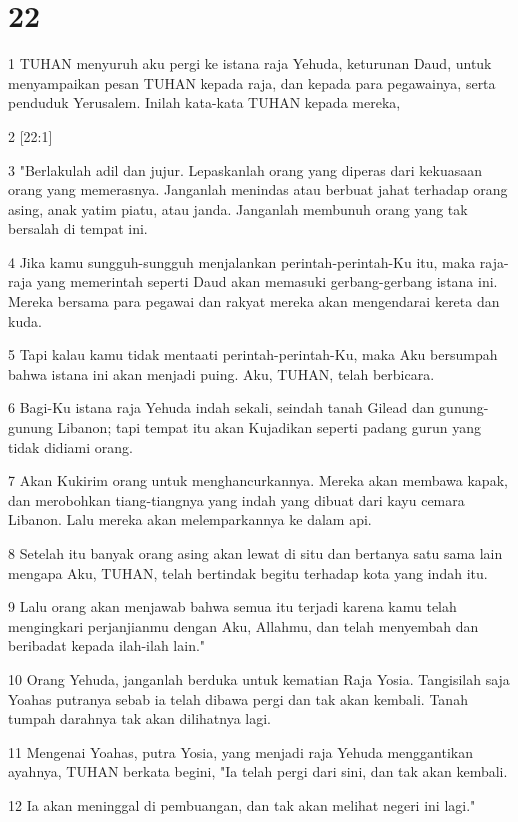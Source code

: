 \chapter{22}

\par 1 TUHAN menyuruh aku pergi ke istana raja Yehuda, keturunan Daud, untuk menyampaikan pesan TUHAN kepada raja, dan kepada para pegawainya, serta penduduk Yerusalem. Inilah kata-kata TUHAN kepada mereka,
\par 2 [22:1]
\par 3 "Berlakulah adil dan jujur. Lepaskanlah orang yang diperas dari kekuasaan orang yang memerasnya. Janganlah menindas atau berbuat jahat terhadap orang asing, anak yatim piatu, atau janda. Janganlah membunuh orang yang tak bersalah di tempat ini.
\par 4 Jika kamu sungguh-sungguh menjalankan perintah-perintah-Ku itu, maka raja-raja yang memerintah seperti Daud akan memasuki gerbang-gerbang istana ini. Mereka bersama para pegawai dan rakyat mereka akan mengendarai kereta dan kuda.
\par 5 Tapi kalau kamu tidak mentaati perintah-perintah-Ku, maka Aku bersumpah bahwa istana ini akan menjadi puing. Aku, TUHAN, telah berbicara.
\par 6 Bagi-Ku istana raja Yehuda indah sekali, seindah tanah Gilead dan gunung-gunung Libanon; tapi tempat itu akan Kujadikan seperti padang gurun yang tidak didiami orang.
\par 7 Akan Kukirim orang untuk menghancurkannya. Mereka akan membawa kapak, dan merobohkan tiang-tiangnya yang indah yang dibuat dari kayu cemara Libanon. Lalu mereka akan melemparkannya ke dalam api.
\par 8 Setelah itu banyak orang asing akan lewat di situ dan bertanya satu sama lain mengapa Aku, TUHAN, telah bertindak begitu terhadap kota yang indah itu.
\par 9 Lalu orang akan menjawab bahwa semua itu terjadi karena kamu telah mengingkari perjanjianmu dengan Aku, Allahmu, dan telah menyembah dan beribadat kepada ilah-ilah lain."
\par 10 Orang Yehuda, janganlah berduka untuk kematian Raja Yosia. Tangisilah saja Yoahas putranya sebab ia telah dibawa pergi dan tak akan kembali. Tanah tumpah darahnya tak akan dilihatnya lagi.
\par 11 Mengenai Yoahas, putra Yosia, yang menjadi raja Yehuda menggantikan ayahnya, TUHAN berkata begini, "Ia telah pergi dari sini, dan tak akan kembali.
\par 12 Ia akan meninggal di pembuangan, dan tak akan melihat negeri ini lagi."
